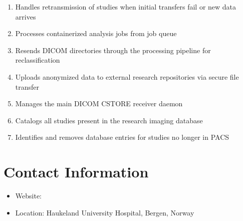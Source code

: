 \documentclass[letterpaper,10pt,english]{sphinxmanual}
\begin{document}
\begin{enumerate}
\item {} 
\sphinxAtStartPar
{\hyperref[\detokenize{Architecture/scripts/resendProject::doc}]{}} \sphinxhyphen{} Handles re\sphinxhyphen{}transmission of studies when initial transfers fail or new data arrives

\item {} 
\sphinxAtStartPar
{\hyperref[\detokenize{Architecture/scripts/runOneJob::doc}]{}} \sphinxhyphen{} Processes containerized analysis jobs from job queue

\item {} 
\sphinxAtStartPar
{\hyperref[\detokenize{Architecture/scripts/s2m::doc}]{}} \sphinxhyphen{} Re\sphinxhyphen{}sends DICOM directories through the processing pipeline for re\sphinxhyphen{}classification

\item {} 
\sphinxAtStartPar
{\hyperref[\detokenize{Architecture/scripts/sendFiles::doc}]{}} \sphinxhyphen{} Uploads anonymized data to external research repositories via secure file transfer

\item {} 
\sphinxAtStartPar
{\hyperref[\detokenize{Architecture/scripts/storectl::doc}]{}} \sphinxhyphen{} Manages the main DICOM C\sphinxhyphen{}STORE receiver daemon

\item {} 
\sphinxAtStartPar
{\hyperref[\detokenize{Architecture/scripts/whatIsInIDS7::doc}]{}}\sphinxhyphen{} Catalogs all studies present in the research imaging database

\item {} 
\sphinxAtStartPar
{\hyperref[\detokenize{Architecture/scripts/whatIsNotInIDS7::doc}]{}}\sphinxhyphen{} Identifies and removes database entries for studies no longer in PACS

\end{enumerate}


\chapter{Contact Information}
\label{\detokenize{index:contact-information}}\begin{itemize}
\item {} 
\sphinxAtStartPar
Website: 

\item {} 
\sphinxAtStartPar
Location: Haukeland University Hospital, Bergen, Norway

\end{itemize}
\end{document}
